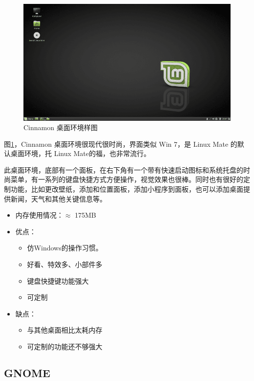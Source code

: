 \documentclass[doctor,openright,twoside]{sjtuthesis}
\providecommand{\tightlist}{%
    \setlength{\itemsep}{0pt}\setlength{\parskip}{0pt}}
\theoremstyle{plain}
\theoremstyle{definition}
\theoremstyle{remark}
\theoremstyle{ocrenumbox}
\theoremstyle{plain}
\begin{document}
\begin{figure}
\includegraphics{de-Cinnamon} \caption[Cinnamon 桌面环境样图]{Cinnamon 桌面环境样图}\label{fig:de-Cinnamon}
\end{figure}

图\ref{fig:de-Cinnamon}，Cinnamon 桌面环境很现代很时尚，界面类似 Win 7，是 Linux Mate 的默认桌面环境，托 Linux Mate的福，也非常流行。

此桌面环境，底部有一个面板，在右下角有一个带有快速启动图标和系统托盘的时尚菜单，有一系列的键盘快捷方式方便操作，视觉效果也很棒。同时也有很好的定制功能，比如更改壁纸，添加和位置面板，添加小程序到面板，也可以添加桌面提供新闻，天气和其他关键信息等。

\begin{itemize}
\tightlist
\item
  内存使用情况：\(\approx\) 175MB
\item
  优点：

  \begin{itemize}
  \tightlist
  \item
    仿Windows的操作习惯。
  \item
    好看、特效多、小部件多
  \item
    键盘快捷键功能强大
  \item
    可定制
  \end{itemize}
\item
  缺点：

  \begin{itemize}
  \tightlist
  \item
    与其他桌面相比太耗内存
  \item
    可定制的功能还不够强大
  \end{itemize}
\end{itemize}

\hypertarget{gnome}{%
\subsection{GNOME}\label{gnome}}
\end{document}
